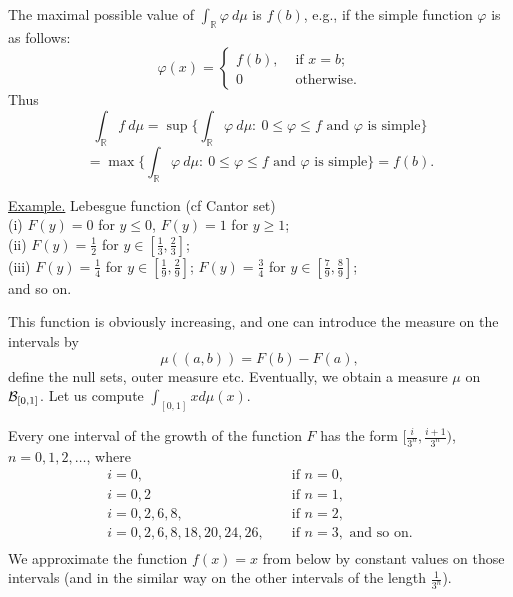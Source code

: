 \documentclass[a4paper,10pt]{article}
\def\RR{\mathbb{R}}
\newcommand{\1}[1]{\mathbf{1}_{\{#1\}}}
\begin{document}
The maximal possible value of $\int_{\RR}\varphi~d\mu$ is $f(b)$, e.g., if the simple function $\varphi$ is as  follows:
$$\varphi(x)=\left\{\begin{array}{ll} f(b), & \mbox{ if } x=b;\\ 0 & \mbox{ otherwise}.\end{array}\right.$$
Thus
$$\int_{\RR}f~d\mu=\sup\{\int_{\RR}\varphi~d\mu:~0\le\varphi\le f \mbox{ and } \varphi \mbox{ is simple}\}$$
$$=\max\{\int_{\RR}\varphi~d\mu:~0\le\varphi\le f \mbox{ and } \varphi \mbox{ is simple}\}=f(b).$$
\blacksquare \vspace{3mm}

\underline{Example.} Lebesgue function (cf Cantor set)\\
(i) $F(y)=0$ for $y\le 0$, $F(y)=1$ for $y\ge 1$;\\
(ii) $F(y)=\frac{1}{2}$ for $y\in[\frac{1}{3},\frac{2}{3}]$;\\
(iii) $F(y)=\frac{1}{4}$ for $y\in[\frac{1}{9},\frac{2}{9}]$; $F(y)=\frac{3}{4}$ for $y\in[\frac{7}{9},\frac{8}{9}]$;\\
and so on.

This function is obviously increasing, and one can introduce the measure on the intervals by
$$\mu((a,b))=F(b)-F(a),$$
define the null sets, outer measure etc. Eventually, we obtain a measure $\mu$ on ${\cal B}_{[0,1]}$. Let us compute $\int_{[0,1]} x d\mu(x)$.

Every one interval of the growth of the function $F$ has the form $[\frac{i}{3^n}, \frac{i+1}{3^n})$, $n=0,1,2,\ldots$, where
\begin{eqnarray*}
i=0, && \mbox{ if } n=0,\\
i=0,2 && \mbox{ if } n=1,\\
i=0,2,6,8, && \mbox{ if } n=2,\\
i=0,2,6,8,18,20,24,26, && \mbox{ if } n=3, \mbox{ and so on.}\\
\end{eqnarray*}
We approximate the function $f(x)=x$ from below by constant values on those intervals (and in the similar way on the other intervals of the length $\frac{1}{3^n}$).\vspace{10cm}
\end{document}
